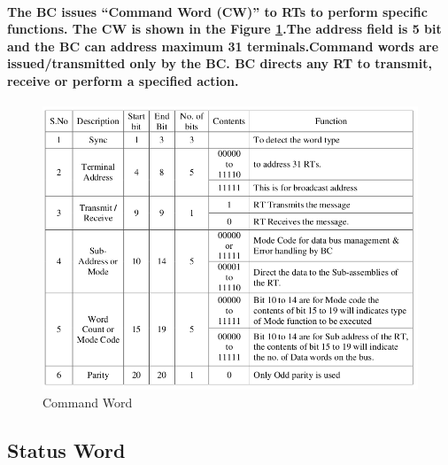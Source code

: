 \documentclass[12pt,a4paper]{report}
\begin{document}
\paragraph{\textrm{\textmd{ The BC issues “Command Word (CW)” to RTs to perform specific functions. The CW is shown in the Figure \ref{fig:cmd}.The address field is 5 bit and the BC can address maximum 31 terminals.Command words are issued/transmitted only by the BC. BC directs any RT to transmit, receive or perform a specified action.}}}
\begin{figure}[h]
	\centering
	\includegraphics[scale=.38]{command.png}
	\caption{Command Word}
	\label{fig:cmd}
\end{figure}
\subsection{Status Word}
\end{document}
